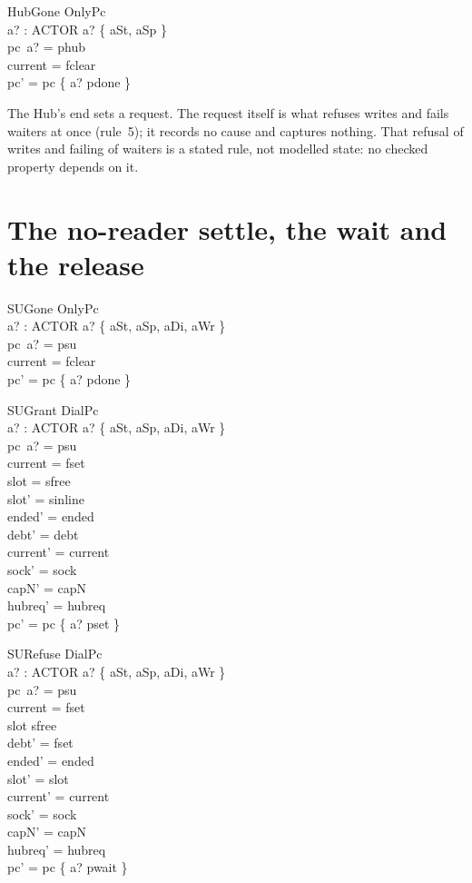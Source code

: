 \documentclass[a4paper,10pt,fleqn]{article}
\begin{document}
\begin{schema}{HubGone}
  OnlyPc \\
  a? : ACTOR
\where
  a? \in \{ aSt, aSp \} \\
  pc~a? = phub \\
  current = fclear \\
  pc' = pc \oplus \{ a? \mapsto pdone \}
\end{schema}

The Hub's end sets a request.  The request itself is what refuses writes and
fails waiters at once (rule~5); it records no cause and captures nothing.  That
refusal of writes and failing of waiters is a stated rule, not modelled state:
no checked property depends on it.

\section{The no-reader settle, the wait and the release}

\begin{schema}{SUGone}
  OnlyPc \\
  a? : ACTOR
\where
  a? \in \{ aSt, aSp, aDi, aWr \} \\
  pc~a? = psu \\
  current = fclear \\
  pc' = pc \oplus \{ a? \mapsto pdone \}
\end{schema}

\begin{schema}{SUGrant}
  DialPc \\
  a? : ACTOR
\where
  a? \in \{ aSt, aSp, aDi, aWr \} \\
  pc~a? = psu \\
  current = fset \\
  slot = sfree \\
  slot' = sinline \\
  ended' = ended \\
  debt' = debt \\
  current' = current \\
  sock' = sock \\
  capN' = capN \\
  hubreq' = hubreq \\
  pc' = pc \oplus \{ a? \mapsto pset \}
\end{schema}

\begin{schema}{SURefuse}
  DialPc \\
  a? : ACTOR
\where
  a? \in \{ aSt, aSp, aDi, aWr \} \\
  pc~a? = psu \\
  current = fset \\
  slot \neq sfree \\
  debt' = fset \\
  ended' = ended \\
  slot' = slot \\
  current' = current \\
  sock' = sock \\
  capN' = capN \\
  hubreq' = hubreq \\
  pc' = pc \oplus \{ a? \mapsto pwait \}
\end{schema}
\end{document}

